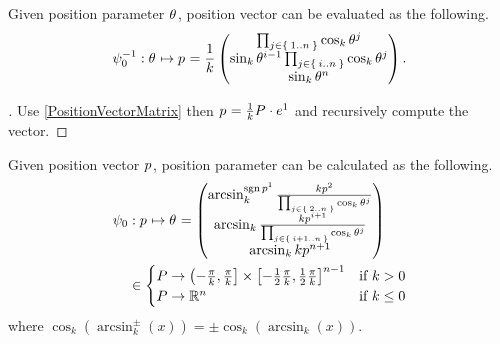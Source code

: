 \documentclass[stu, babel, american, biblatex, a4paper, draftall]{apa7}
\begin{document}
\begin{lemma}\label{PositionVectorValue}
    Given position parameter $\tensor{\theta}{}$, position vector can be evaluated as the following.
    \begin{equation*}
        \psi_0^{-1}: \tensor{\theta}{} \mapsto \tensor{p}{}
        = \frac{1}{k}
        \begin{pmatrix}
            \prod_{j\in\Set{1..n}}{\cos_k{\tensor{\theta}{^j}}}                                \\
            \sin_k{\tensor{\theta}{^{i-1}}}\prod_{j\in\Set{i..n}}{\cos_k{\tensor{\theta}{^j}}} \\
            \sin_k{{\tensor{\theta}{^n}}}                                                      \\
        \end{pmatrix}\text{.}
    \end{equation*}
\end{lemma}
\begin{proof}[]
    \skipped

    Use \cref{PositionVectorMatrix} then $\tensor{p}{}=\frac{1}{k}\tensor{P}{}\cdot\tensor{e}{^1}$ and recursively compute the vector.
\end{proof}
\begin{lemma}\label{PositionParameterValue}
    Given position vector $\tensor{p}{}$, position parameter can be calculated as the following.
    \begin{align*}
        \psi_0
         & : \tensor{p}{} \mapsto \tensor{\theta}{}
        =
        \begin{pmatrix}
            \arcsin_k^{\sign{\tensor{p}{^1}}}{\frac{k\tensor{p}{^2}}{\prod_{j\in\Set{2..n}}{\cos_k{\tensor{\theta}{^j}}}}} \\
            \arcsin_k{\frac{k\tensor{p}{^{i+1}}}{\prod_{j\in\Set{i+1..n}}{\cos_k{\tensor{\theta}{^j}}}}}                   \\
            \arcsin_k{k\tensor{p}{^{n+1}}}                                                                                 \\
        \end{pmatrix}                  \\
         & \in
        \begin{cases}
            P \to \left(-\frac{\pi}{k}, \frac{\pi}{k}\right]\times\left[-\frac{1}{2}\frac{\pi}{k}, \frac{1}{2}\frac{\pi}{k}\right]^{n-1} & \text{if $k>0$}   \\
            P \to \real^{n}                                                                                                              & \text{if $k\le0$} \\
        \end{cases}
    \end{align*}
    where $\cos_k\left(\arcsin_k^{\pm}\left(x\right)\right) = \pm \cos_k\left(\arcsin_k\left(x\right)\right)$.
\end{lemma}
\end{document}

